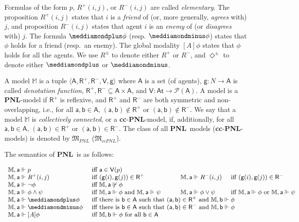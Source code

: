 \documentclass{easychair}
\newcommand{\At}{\mathsf{At}}
\newcommand{\M}{\mathbb{M}}
\newcommand{\A}{\mathsf{A}}
\newcommand{\R}{\mathsf{R}}
\newcommand{\V}{\mathsf{V}}
\newcommand{\g}{\mathsf{g}}
\newcommand{\ag}{\mathsf{a}}
\renewcommand{\b}{\mathsf{b}}
\newcommand{\dplus}{\meddiamondplus}
\newcommand{\dminus}{\meddiamondminus}
\newcommand{\dplusminus}{\Diamond^{\pm}}
\newcommand{\ccpnlmodels}{\mathfrak{M}_{\textit{ccPNL}}}
\newcommand{\pnlmodels}{\mathfrak{M}_{\textit{PNL}}}
\newcommand{\PNL}{\textbf{PNL}}
\newcommand{\cc}{\textbf{cc}}
\begin{document}
 Formulas of the form $p$, $R^+(i,j)$, or $R^-(i,j)$ are called \emph{elementary}.
The proposition $R^+(i,j)$ states that $i$ is a \emph{friend} of (or, more generally, \emph{agrees} with)
 $j$, and proposition $R^-(i,j)$ states that agent $i$ is an \emph{enemy} of (or \emph{disagrees} with) $j$. 
The formula $\dplus \phi$ (resp. $\dminus \phi$) states that $\phi$ holds for  a friend (resp.\ an enemy). The global
modality $[A]\phi$ states that $\phi$ holds for all the agents. 
We use $R^\pm$ to denote either $R^+$ or $R^-$, and 
 $\dplusminus$ to denote either $\dplus$ or $\dminus$. 





A model $\mathbb{M}$ is a tuple $\langle \A,\R^+,\R^-,\V,\g\rangle$ where $\A$
is a set (of agents), $\g:N\rightarrow \A$ is called \emph{denotation
function}, $\R^+,\R^-\subseteq \A\times \A$, and $\V:\At\rightarrow
\mathcal{P}(\A)$. A model is a \PNL-model if 
$\R^+$ is reflexive,  and 
$\R^+$ and $\R^-$ are both symmetric and 
non-overlapping, i.e.,  for all $\ag,\b\in \A$, $(\ag,\b)\notin \R^+$ or $(\ag,\b)\notin \R^-$. 
We say that a model $\M$ is \emph{collectively connected}, or a \cc-\PNL-model,
if,  additionally,  for all $\ag,\b\in \A$,   $(\ag,\b)\in \R^+$ or $(\ag,\b)\in \R^-$.
The class of all \PNL~models (\cc-\PNL-models) is denoted by  $\pnlmodels$ ($\ccpnlmodels$).

The semantics of \PNL~is as follows:

\noindent$
    \small
\begin{array}{lll l lll}
    \mathbb{M},\ag \Vdash p &\text{ iff } \ag\in \V(p) \\
    \mathbb{M},\ag \Vdash R^+(i,j) &\text{ iff } (\g(i),\g(j))\in \R^+ & \quad & 
    \mathbb{M},\ag \Vdash R^-(i,j) &\text{ iff } (\g(i),\g(j))\in \R^-\\
    \mathbb{M},\ag \Vdash \neg \phi &\text{ iff } \mathbb{M},\ag \not \Vdash \phi\\
    \mathbb{M},\ag \Vdash \phi \wedge \psi &\text{ iff } \mathbb{M},\ag \Vdash \phi \text{ and } \mathbb{M},\ag \Vdash \psi &\quad&
    \mathbb{M},\ag \Vdash \phi \vee \psi &\text{ iff } \mathbb{M},\ag \Vdash \phi \text{ or } \mathbb{M},\ag \Vdash \psi\\
\mathbb{M},\ag \Vdash \dplus\phi & \multicolumn{6}{l}{\text{ iff there is } \b\in \A \text{ such that } (\ag,\b)\in \R^+ \text{ and } \mathbb{M},\b \Vdash \phi}\\
    \mathbb{M},\ag \Vdash \dminus\phi &\multicolumn{6}{l}{\text{ iff there is } \b\in \A \text{ such that } (\ag,\b)\in \R^- \text{ and } \mathbb{M},\b \Vdash \phi}\\
    \mathbb{M},\ag \Vdash [A]\phi &\multicolumn{6}{l}{\text{ iff } \mathbb{M},\b \Vdash \phi \text{ for all } \b\in \A}
\end{array}
$
\end{document}
